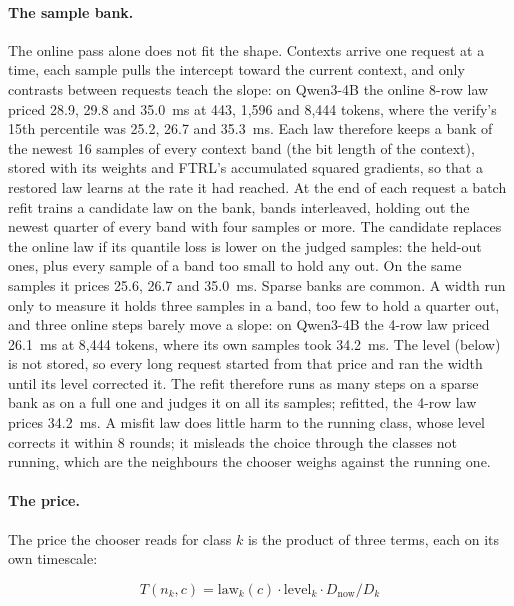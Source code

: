 \documentclass[10pt,twocolumn,letterpaper]{article}
\begin{document}
\paragraph{The sample bank.} The online pass alone does not fit the shape. Contexts arrive one request at a time, each sample pulls the intercept toward the current context, and only contrasts between requests teach the slope: on Qwen3-4B the online 8-row law priced 28.9, 29.8 and 35.0~ms at 443, 1,596 and 8,444 tokens, where the verify's 15th percentile was 25.2, 26.7 and 35.3~ms. Each law therefore keeps a bank of the newest 16 samples of every context band (the bit length of the context), stored with its weights and FTRL's accumulated squared gradients, so that a restored law learns at the rate it had reached. At the end of each request a batch refit trains a candidate law on the bank, bands interleaved, holding out the newest quarter of every band with four samples or more. The candidate replaces the online law if its quantile loss is lower on the judged samples: the held-out ones, plus every sample of a band too small to hold any out. On the same samples it prices 25.6, 26.7 and 35.0~ms. Sparse banks are common. A width run only to measure it holds three samples in a band, too few to hold a quarter out, and three online steps barely move a slope: on Qwen3-4B the 4-row law priced 26.1~ms at 8,444 tokens, where its own samples took 34.2~ms. The level (below) is not stored, so every long request started from that price and ran the width until its level corrected it. The refit therefore runs as many steps on a sparse bank as on a full one and judges it on all its samples; refitted, the 4-row law prices 34.2~ms. A misfit law does little harm to the running class, whose level corrects it within 8 rounds; it misleads the choice through the classes not running, which are the neighbours the chooser weighs against the running one.

\paragraph{The price.} The price the chooser reads for class $k$ is the product of three terms, each on its own timescale:

\begin{equation}\label{eq:5}
T(n_k, c) = \mathrm{law}_k(c)\cdot \mathrm{level}_k \cdot D_{\mathrm{now}}/D_k
\end{equation}
\end{document}
